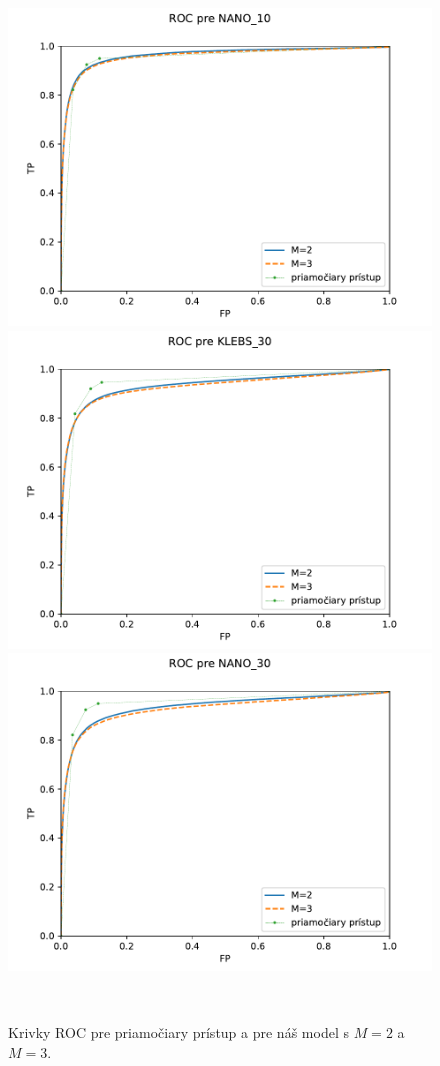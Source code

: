 \begin{figure}[!ht]
\begin{center}
\begin{minipage}{\textwidth}
     \includegraphics[width=.47\textwidth]{plots/6_ROC_nanolution_10}\\
     \includegraphics[width=.47\textwidth]{plots/6_ROC_klebs_30}\quad
     \includegraphics[width=.47\textwidth]{plots/6_ROC_nanolution_30}
   \end{minipage}\\[1em]   
   \end{center}
\caption{Krivky ROC pre priamočiary prístup a pre náš model s $M=2$ a $M=3$.}
\label{fig:ROC_final}
\end{figure}
 
